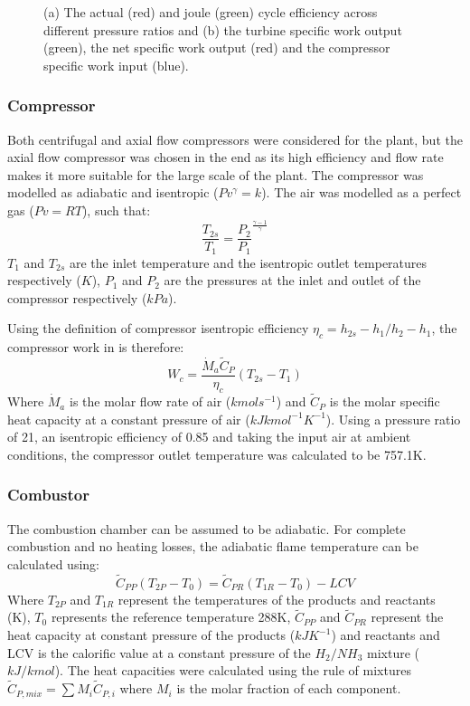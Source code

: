 \begin{figure} [h]
\begin{subfigure}{.7\textwidth}
 \label{fig:sub2}
\end{subfigure}
\caption{(a) The actual (red) and joule (green) cycle efficiency across different pressure ratios and (b) the turbine specific work output (green), the net specific work output (red) and the compressor specific work input (blue).}
\label{fig:efficiencysimple}
\end{figure} 

\subsubsection{Compressor} \label{ssec:compressor} %
Both centrifugal and axial flow compressors were considered for the plant, but the axial flow compressor was chosen in the end as its high efficiency and flow rate makes it more suitable for the large scale of the plant. The compressor was modelled as adiabatic and isentropic ($Pv^{\gamma} = k$). The air was modelled as a perfect gas ($Pv = RT$), such that:
\begin{equation}
\frac{T_{2s}}{T_1} = \frac{P_2}{P_1}^{\frac{\gamma-1}{\gamma}}
\end{equation}
$T_{1}$ and $T_{2s}$ are the inlet temperature and the isentropic outlet temperatures respectively ($K$), $P_1$ and $P_2$ are the pressures at the inlet and outlet of the compressor respectively ($kPa$).

Using the definition of compressor isentropic efficiency $\eta_c = {h_{2s} - h_1}/{h_2 - h_1} $, the compressor work in is therefore:
\begin{equation}
W_{c} = \frac {\dot{M}_a \tilde{C}_P}{\eta_c} (T_{2s} - T_1)
\end{equation}
Where $\dot{M}_a$ is the molar flow rate of air ($kmols^{-1}$) and $\tilde{C}_P$ is the molar specific heat capacity at a constant pressure of air ($kJkmol^{-1}K^{-1}$). Using a pressure ratio of 21, an isentropic efficiency of 0.85 and taking the input air at ambient conditions, the compressor outlet temperature was calculated to be 757.1K.  

\subsubsection{Combustor} 
The combustion chamber can be assumed to be adiabatic. For complete combustion and no heating losses, the adiabatic flame temperature can be calculated using:
\begin{equation}
\tilde{C}_{PP} (T_{2P} - T_0) = \tilde{C}_{PR} (T_{1R} - T_0) - LCV 
\end{equation}
Where $T_{2P}$ and $T_{1R}$ represent the temperatures of the products and reactants (K), $T_0$ represents the reference temperature 288K, $\tilde{C}_{PP}$ and $\tilde{C}_{PR}$ represent the heat capacity at constant pressure of the products ($kJK^{-1}$) and reactants and LCV is the calorific value at a constant pressure of the $H_2/NH_3$ mixture ($kJ/kmol$). The heat capacities were calculated using the rule of mixtures $\tilde{C}_{P, mix} = \sum\nolimits M_i \tilde{C}_{P, i}$ where $M_i$ is the molar fraction of each component. %

